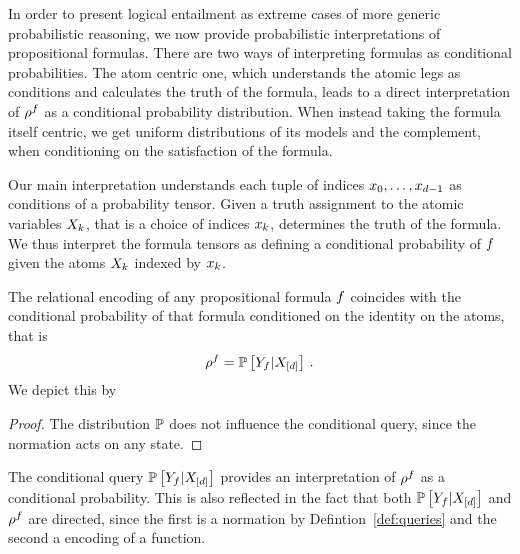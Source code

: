 In order to present logical entailment as extreme cases of more generic probabilistic reasoning, we now provide probabilistic interpretations of propositional formulas.
There are two ways of interpreting formulas as conditional probabilities.
The atom centric one, which understands the atomic legs as conditions and calculates the truth of the formula, leads to a direct interpretation of $\rho^{f}$ as a conditional probability distribution.
When instead taking the formula itself centric, we get uniform distributions of its models and the complement, when conditioning on the satisfaction of the formula.


Our main interpretation understands each tuple of indices ${x_{0},\ldots,x_{d-1}}$ as conditions of a probability tensor.
Given a truth assignment to the atomic variables $X_{k}$, that is a choice of indices $x_{k}$, determines the truth of the formula.
We thus interpret the formula tensors as defining a conditional probability of $f$ given the atoms $X_{k}$ indexed by $x_{k}$.

\begin{theorem}\label{the:conditionByAtoms}
	The relational encoding of any propositional formula $f$ coincides with the conditional probability of that formula conditioned on the identity on the atoms, that is
		\[ \rho^{f} = \mathbb{P}\left[Y_{f}|X_{[d]}\right] \, . \]
	We depict this by
	\begin{center}
		
	\end{center}
\end{theorem}
\begin{proof}
	The distribution $\mathbb{P}$ does not influence the conditional query, since the normation acts on any state.
\end{proof}


The conditional query $\mathbb{P}\left[Y_{f}|X_{[d]}\right]$ provides an interpretation of $\rho^{f}$ as a conditional probability. 
This is also reflected in the fact that both $\mathbb{P}\left[Y_{f}|X_{[d]}\right]$ and $\rho^{f}$ are directed, since the first is a normation by Defintion~\ref{def:queries} and the second a encoding of a function.

